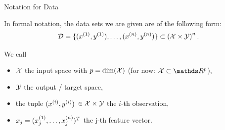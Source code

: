\documentclass[11pt,compress,t,notes=noshow, xcolor=table]{beamer}
\begin{document}
\begin{vbframe}{Notation for Data}

In formal notation, the data sets we are given are of the following form:
\[
\mathcal{D} = \{ (x^{(1)}, y^{(1)}), \ldots, (x^{(n)}, y^{(n)})\} \subset \left(\mathcal{X} \times \mathcal{Y}\right)^n.
\]

We call

\begin{itemize}

  \item $\mathcal{X}$  the input space with $p = \text{dim}(\mathcal{X})$ (for now: 
  $\Xspace \subset \R^p$),
  
  \item $\mathcal{Y}$ the output / target space,
  
  \item the tuple \((x^{(i)}, y^{(i)})\) $\in \mathcal{X}\times \mathcal{Y}$ the \(i\)-th observation,
  
  \item $x_j = (x^{(1)}_j, \ldots, x^{(n)}_j)^T$ the j-th feature vector.
  
\end{itemize}

\end{vbframe}

\end{document}
